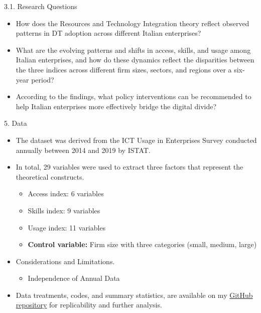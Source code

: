 \documentclass[
  ignorenonframetext,
]{beamer}
\providecommand{\tightlist}{%
  \setlength{\itemsep}{0pt}\setlength{\parskip}{0pt}}
\begin{document}
\begin{frame}{3.1. Research Questions}
\label{research-questions}
\begin{itemize}
\item
  How does the Resources and Technology Integration theory reflect
  observed patterns in DT adoption across different Italian enterprises?
\item
  What are the evolving patterns and shifts in access, skills, and usage
  among Italian enterprises, and how do these dynamics reflect the
  disparities between the three indices across different firm sizes,
  sectors, and regions over a six-year period?
\item
  According to the findings, what policy interventions can be
  recommended to help Italian enterprises more effectively bridge the
  digital divide?
\end{itemize}
\end{frame}

\begin{frame}{5. Data}
\label{data}
\begin{itemize}
\item
  The dataset was derived from the ICT Usage in Enterprises Survey
  conducted annually between 2014 and 2019 by ISTAT.
\item
  In total, 29 variables were used to extract three factors that
  represent the theoretical constructs.

  \begin{itemize}
  \tightlist
  \item
    Access index: 6 variables
  \item
    Skills index: 9 variables
  \item
    Usage index: 11 variables
  \item
    \textbf{Control variable:} Firm size with three categories (small,
    medium, large)
  \end{itemize}
\item
  Considerations and Limitations.

  \begin{itemize}
  \tightlist
  \item
    Independence of Annual Data
  \end{itemize}
\item
  Data treatments, codes, and summary statistics, are available on my
  \href{https://github.com/luchocastillo84/Factor_Analysis_Digital_Divide/tree/main}{GitHub
  repository} for replicability and further analysis.
\end{itemize}
\end{frame}
\end{document}
